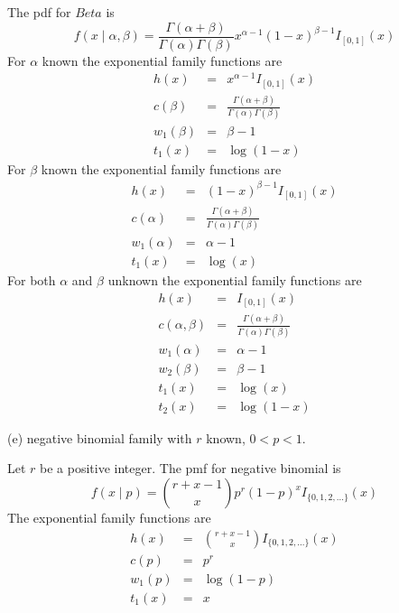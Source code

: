 \documentclass[12pt]{article}
\begin{document}
\bigskip
\noindent
The pdf for $Beta$ is
$$f(x\mid\alpha,\beta)=
\frac{\Gamma(\alpha+\beta)}{\Gamma(\alpha)\Gamma(\beta)}
x^{\alpha-1}(1-x)^{\beta-1}I_{[0,1]}(x)$$
For $\alpha$ known the exponential family functions are
\begin{eqnarray*}
h(x)&=&x^{\alpha-1}I_{[0,1]}(x)\\
c(\beta)&=&
\frac{\Gamma(\alpha+\beta)}{\Gamma(\alpha)\Gamma(\beta)}\\
w_1(\beta)&=&\beta-1\\
t_1(x)&=&\log(1-x)
\end{eqnarray*}
%
For $\beta$ known the exponential
family functions are
\begin{eqnarray*}
h(x)&=&(1-x)^{\beta-1}I_{[0,1]}(x)\\
c(\alpha)&=&
\frac{\Gamma(\alpha+\beta)}{\Gamma(\alpha)\Gamma(\beta)}\\
w_1(\alpha)&=&\alpha-1\\
t_1(x)&=&\log(x)
\end{eqnarray*}
%
For both $\alpha$ and $\beta$ unknown the exponential
family functions are
\begin{eqnarray*}
h(x)&=&I_{[0,1]}(x)\\
c(\alpha,\beta)&=&
\frac{\Gamma(\alpha+\beta)}{\Gamma(\alpha)\Gamma(\beta)}\\
w_1(\alpha)&=&\alpha-1\\
w_2(\beta)&=&\beta-1\\
t_1(x)&=&\log(x)\\
t_2(x)&=&\log(1-x)
\end{eqnarray*}

\bigskip
\noindent
(e) negative binomial family with $r$ known, $0<p<1$.

\bigskip
\noindent
Let $r$ be a positive integer.
The pmf for negative binomial is
$$f(x\mid p)=\binom{r+x-1}{x}p^r(1-p)^xI_{\{0,1,2,\ldots\}}(x)$$
The exponential family functions are
\begin{eqnarray*}
h(x)&=&\binom{r+x-1}{x}I_{\{0,1,2,\ldots\}}(x)\\
c(p)&=&p^r\\
w_1(p)&=&\log(1-p)\\
t_1(x)&=&x
\end{eqnarray*}
\end{document}
